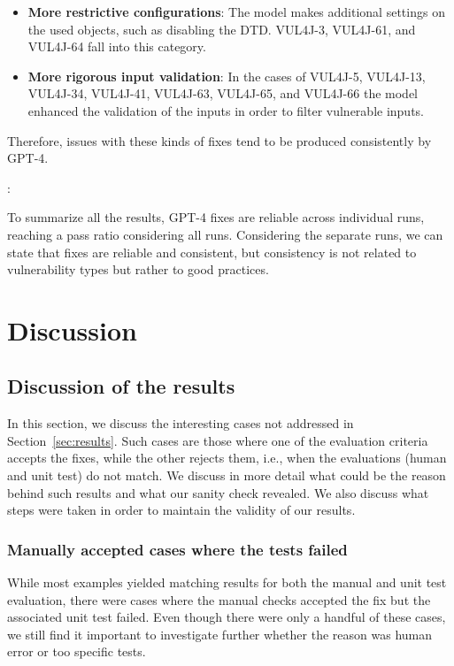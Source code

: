 \begin{itemize}
	\item \textbf{More restrictive configurations}: The model makes additional settings on the used objects, such as disabling the DTD. VUL4J-3, VUL4J-61, and VUL4J-64 fall into this category.
	\item \textbf{More rigorous input validation}: In the cases of VUL4J-5, VUL4J-13, VUL4J-34, VUL4J-41, VUL4J-63, VUL4J-65, and VUL4J-66 the model enhanced the validation of the inputs in order to filter vulnerable inputs.
\end{itemize}

Therefore, issues with these kinds of fixes tend to be produced consistently by GPT-4.
\begin{framed}
	\noindent {}: \textbf{\secondthesisrqthree}
	
	\noindent To summarize all the results, GPT-4 fixes are reliable across individual runs, reaching a \consistentrat{} pass ratio considering all runs.
	Considering the separate runs, we can state that fixes are reliable and consistent, but consistency is not related to vulnerability types but rather to good practices.
\end{framed}

\section{Discussion}
\label{sec:discussion}

\subsection{Discussion of the results}

In this section, we discuss the interesting cases not addressed in Section~\ref{sec:results}.
Such cases are those where one of the evaluation criteria accepts the fixes, while the other rejects them, i.e., when the evaluations (human and unit test) do not match.
We discuss in more detail what could be the reason behind such results and what our sanity check revealed.
We also discuss what steps were taken in order to maintain the validity of our results.

\subsubsection{Manually accepted cases where the tests failed}
\label{sec:discussion:manfail}
While most examples yielded matching results for both the manual and unit test evaluation, there were cases where the manual checks accepted the fix but the associated unit test failed.
Even though there were only a handful of these cases, we still find it important to investigate further whether the reason was human error or too specific tests.

